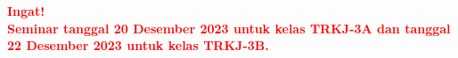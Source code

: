 \documentclass[a4paper]{tufte-handout}
\begin{document}
\hrulefill

\begin{center}
\noindent
\textbf{\textcolor{red}{Ingat!\\ Seminar tanggal 20 Desember 2023 untuk kelas TRKJ-3A dan tanggal 22 Desember 2023 untuk kelas TRKJ-3B.}}
\end{center}

\hrulefill


\clearpage


\end{document}
